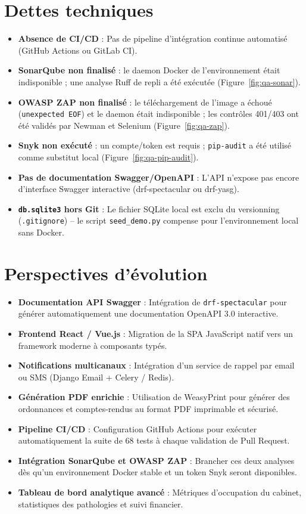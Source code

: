 \documentclass[12pt,a4paper]{report}
\begin{document}
\section{Dettes techniques}

\begin{itemize}[leftmargin=*]
  \item \textbf{Absence de CI/CD} : Pas de pipeline d'intégration continue automatisé (GitHub Actions ou GitLab CI).
  \item \textbf{SonarQube non finalisé} : le daemon Docker de l'environnement était indisponible ; une analyse Ruff de repli a été exécutée (Figure~\ref{fig:qa-sonar}).
  \item \textbf{OWASP ZAP non finalisé} : le téléchargement de l'image a échoué (\texttt{unexpected EOF}) et le daemon était indisponible ; les contrôles 401/403 ont été validés par Newman et Selenium (Figure~\ref{fig:qa-zap}).
  \item \textbf{Snyk non exécuté} : un compte/token est requis ; \texttt{pip-audit} a été utilisé comme substitut local (Figure~\ref{fig:qa-pip-audit}).
  \item \textbf{Pas de documentation Swagger/OpenAPI} : L'API n'expose pas encore d'interface Swagger interactive (drf-spectacular ou drf-yasg).
  \item \textbf{\texttt{db.sqlite3} hors Git} : Le fichier SQLite local est exclu du versionning (\texttt{.gitignore}) -- le script \texttt{seed\_demo.py} compense pour l'environnement local sans Docker.
\end{itemize}

\section{Perspectives d'évolution}

\begin{itemize}[leftmargin=*]
  \item \textbf{Documentation API Swagger} : Intégration de \texttt{drf-spectacular} pour générer automatiquement une documentation OpenAPI 3.0 interactive.
  \item \textbf{Frontend React / Vue.js} : Migration de la SPA JavaScript natif vers un framework moderne à composants typés.
  \item \textbf{Notifications multicanaux} : Intégration d'un service de rappel par email ou SMS (Django Email + Celery / Redis).
  \item \textbf{Génération PDF enrichie} : Utilisation de WeasyPrint pour générer des ordonnances et comptes-rendus au format PDF imprimable et sécurisé.
  \item \textbf{Pipeline CI/CD} : Configuration GitHub Actions pour exécuter automatiquement la suite de 68 tests à chaque validation de Pull Request.
  \item \textbf{Intégration SonarQube et OWASP ZAP} : Brancher ces deux analyses dès qu'un environnement Docker stable et un token Snyk seront disponibles.
  \item \textbf{Tableau de bord analytique avancé} : Métriques d'occupation du cabinet, statistiques des pathologies et suivi financier.
\end{itemize}
\end{document}
